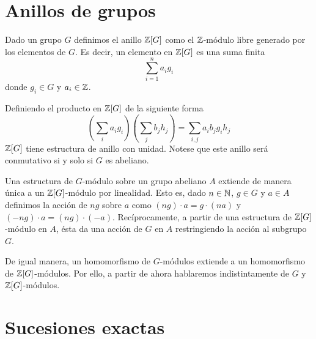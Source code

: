 %

\section{Anillos de grupos}

Dado un grupo $G$ definimos el anillo $\mathbb{Z}[G]$ como el $\mathbb{Z}$-módulo libre generado por los elementos de $G$. Es decir, un elemento en $\mathbb{Z}[G]$ es una suma finita
\begin{equation*}
	\sum_{i=1}^n a_ig_i
\end{equation*}
donde $g_i\in G$ y $a_i\in \mathbb{Z}$.

Definiendo el producto en $\mathbb{Z}[G]$ de la siguiente forma
\begin{equation*}
	\left(\sum_i a_ig_i\right) \left(\sum_jb_jh_j\right) = \sum_{i,j} a_ib_jg_ih_j
\end{equation*}
$\mathbb{Z}[G]$ tiene estructura de anillo con unidad. Notese que este anillo será conmutativo si y solo si $G$ es abeliano.

\begin{observacion}
	Una estructura de $G$-módulo sobre un grupo abeliano $A$ extiende de manera única a un $\mathbb{Z}[G]$-módulo por linealidad. Esto es, dado $n\in\mathbb{N}$, $g\in G$ y $a\in A$ definimos la acción de $ng$ sobre $a$ como $(ng)\cdot a = g\cdot (na)$ y $(-n g)\cdot a = (n g)\cdot (-a)$. Recíprocamente, a partir de una estructura de $\mathbb{Z}[G]$-módulo en $A$, ésta da una acción de $G$ en $A$ restringiendo la acción al subgrupo $G$.
	
	De igual manera, un homomorfismo de $G$-módulos extiende a un homomorfismo de $\mathbb{Z}[G]$-módulos.
	Por ello, a partir de ahora hablaremos indistintamente de $G$ y $\mathbb{Z}[G]$-módulos.
\end{observacion}

\section{Sucesiones exactas}

